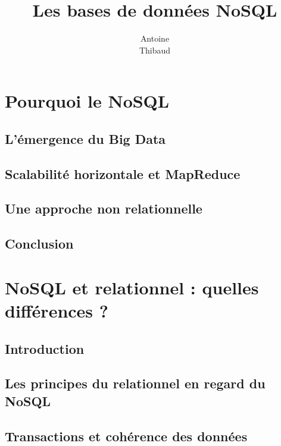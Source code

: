 \documentclass[12pt,titlepage,a4paper]{report}
\title{Les bases de données NoSQL}
\author{Antoine \bsc{Augusti}\\ Thibaud \bsc{Dauce}}
\begin{document}
	\dominitoc
	\tableofcontents

	\chapter{Pourquoi le NoSQL}
	\minitoc

		\section{L'émergence du Big Data}
			

		\section{Scalabilité horizontale et MapReduce}
			

		\section{Une approche non relationnelle}
			

		\section*{Conclusion}
			

	\chapter{NoSQL et relationnel : quelles différences ?}
	\minitoc

		\section*{Introduction}
			

		\section{Les principes du relationnel en regard du NoSQL}
      


		\section{Transactions et cohérence des données}
			
\end{document}

